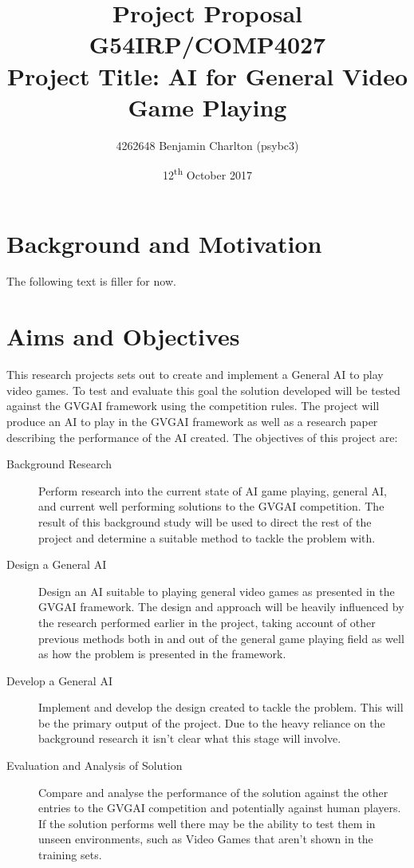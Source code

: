 \documentclass[a4paper]{article}
\begin{document}
\title{
    Project Proposal
    \\ \large{G54IRP/COMP4027}
    \\ \large{Project Title: AI for General Video Game Playing}\vspace{-3ex}}
\author{4262648 Benjamin Charlton (psybc3)}
\date{\vspace{-2ex}12\textsuperscript{th} October 2017}
\maketitle

\section{Background and Motivation}
The following text is filler for now.
\par
\lipsum[1-7]

\section{Aims and Objectives}
This research projects sets out to create and implement a General AI to play video games.
To test and evaluate this goal the solution developed will be tested against the GVGAI framework using the competition rules.\cite{GVGAI2014}
The project will produce an AI to play in the GVGAI framework as well as a research paper describing the performance of the AI created.
\bigbreak
\noindent The objectives of this project are:
\begin{description}
    \item [Background Research]
    Perform research into the current state of AI game playing, general AI, and current well performing solutions to the GVGAI competition.
    The result of this background study will be used to direct the rest of the project and determine a suitable method to tackle the problem with.

    \item [Design a General AI]
    Design an AI suitable to playing general video games as presented in the GVGAI framework.
    The design and approach will be heavily influenced by the research performed earlier in the project, taking account of other previous methods both in and out of the general game playing field as well as how the problem is presented in the framework.

    \item [Develop a General AI]
    Implement and develop the design created to tackle the problem.
    This will be the primary output of the project.
    Due to the heavy reliance on the background research it isn't clear what this stage will involve.

    \item [Evaluation and Analysis of Solution]
    Compare and analyse the performance of the solution against the other entries to the GVGAI competition and potentially against human players.
    If the solution performs well there may be the ability to test them in unseen environments, such as Video Games that aren't shown in the training sets.
\end{description}
\end{document}
